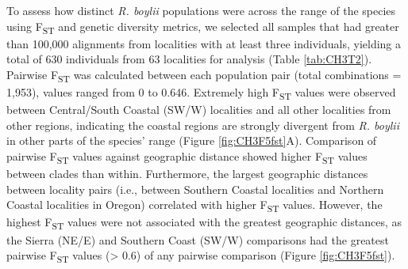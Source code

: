 \documentclass[proquest,12pt,final]{ucthesis-CA2012} %
\begin{document}
\begin{ucmainmatter}
To assess how distinct \emph{R. boylii} populations were across the
range of the species using F\textsubscript{ST} and genetic diversity
metrics, we selected all samples that had greater than 100,000
alignments from localities with at least three individuals, yielding a
total of 630 individuals from 63 localities for analysis (Table
\ref{tab:CH3T2}). Pairwise F\textsubscript{ST} was calculated between
each population pair (total combinations = 1,953), values ranged from 0
to 0.646. Extremely high F\textsubscript{ST} values were observed
between Central/South Coastal (SW/W) localities and all other localities
from other regions, indicating the coastal regions are strongly
divergent from \emph{R. boylii} in other parts of the species' range
(Figure \ref{fig:CH3F5fst}A). Comparison of pairwise F\textsubscript{ST}
values against geographic distance showed higher F\textsubscript{ST}
values between clades than within. Furthermore, the largest geographic
distances between locality pairs (i.e., between Southern Coastal
localities and Northern Coastal localities in Oregon) correlated with
higher F\textsubscript{ST} values. However, the highest
F\textsubscript{ST} values were not associated with the greatest
geographic distances, as the Sierra (NE/E) and Southern Coast (SW/W)
comparisons had the greatest pairwise F\textsubscript{ST} values
(\textgreater{} 0.6) of any pairwise comparison (Figure
\ref{fig:CH3F5fst}).

\par


\end{ucmainmatter}
\end{document}
